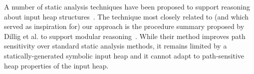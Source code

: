 

A number of static analysis techniques have been proposed
to support reasoning about input heap structures~\cite{}. The technique
most closely related to (and which served as inspiration for) our approach
is the procedure summary proposed by Dillig et al. to support modular
reasoning~\cite{Dillig:2011}.  While
their method improves path sensitivity over standard static
analysis methods, it remains limited by a statically-generated
symbolic input heap and it cannot adapt to path-sensitive heap
properties of the input heap.






